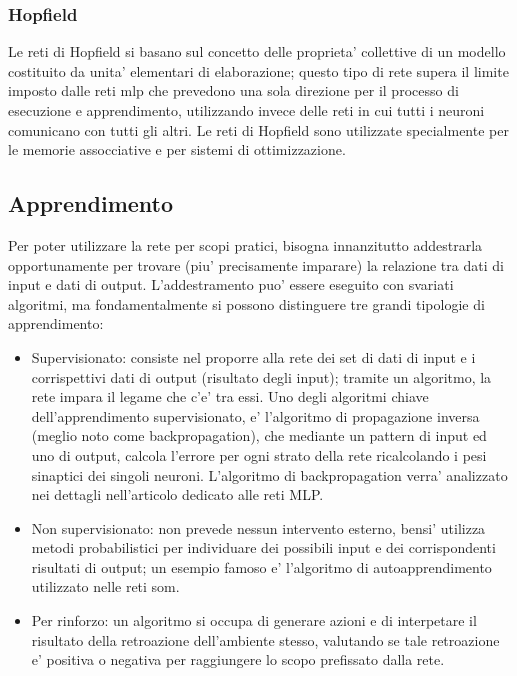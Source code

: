 \documentclass[a4paper,10pt]{report}
\begin{document}
\subsubsection{Hopfield}
Le reti di Hopfield si basano sul concetto delle proprieta' collettive
di un modello costituito da unita' elementari di elaborazione; questo
tipo di rete supera il limite imposto dalle reti mlp che prevedono una sola
direzione per il processo di esecuzione e apprendimento, utilizzando invece
delle reti in cui tutti i neuroni comunicano con tutti gli altri.
Le reti
di Hopfield sono utilizzate specialmente per le memorie assocciative
e per sistemi di ottimizzazione.


\subsection{Apprendimento}
Per poter utilizzare la rete per scopi pratici, bisogna innanzitutto addestrarla
opportunamente per trovare (piu' precisamente imparare) la relazione
tra dati di input e dati di output. L'addestramento puo' essere
eseguito con svariati algoritmi, ma fondamentalmente si
possono distinguere tre grandi tipologie di apprendimento:

\begin{itemize}
\item Supervisionato: consiste nel proporre alla rete dei set di dati di input e i 
corrispettivi
dati di output (risultato degli input); tramite un algoritmo, la rete
impara il legame che c'e' tra essi.
Uno degli algoritmi chiave dell'apprendimento supervisionato, e' l'algoritmo
di propagazione inversa (meglio noto come backpropagation), che mediante
un pattern di input ed uno di output, calcola l'errore per ogni strato
della rete ricalcolando i pesi sinaptici dei singoli neuroni.
L'algoritmo di backpropagation verra' analizzato nei dettagli
nell'articolo dedicato alle reti MLP.


\item Non supervisionato: non prevede nessun intervento esterno, bensi' utilizza
metodi probabilistici per individuare dei possibili input e dei corrispondenti
risultati di output; un esempio famoso e' l'algoritmo di autoapprendimento
utilizzato nelle reti som.


\item Per rinforzo: un algoritmo si occupa di generare azioni e di interpetare il 
risultato della retroazione dell'ambiente stesso, valutando se tale retroazione 
e' positiva o negativa per raggiungere lo scopo prefissato dalla rete.
\end{itemize}
\end{document}
